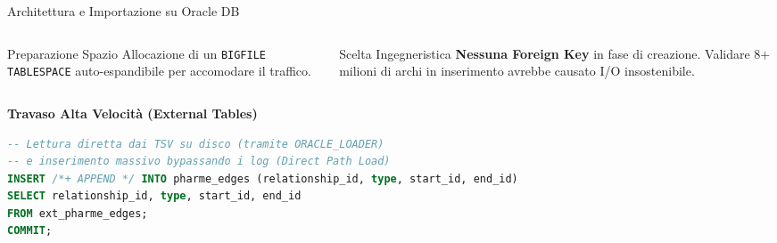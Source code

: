 \documentclass[aspectratio=169]{beamer}
\begin{document}
\begin{frame}[fragile]{Architettura e Importazione su Oracle DB}
    \begin{columns}[T]
        \begin{column}{0.48\textwidth}
            \begin{block}{\faDatabase \hspace{0.2cm} Preparazione Spazio}
                \small
                Allocazione di un \texttt{BIGFILE TABLESPACE} auto-espandibile per accomodare il traffico.
            \end{block}
        \end{column}
        
        \begin{column}{0.48\textwidth}
            \begin{alertblock}{\faExclamationTriangle \hspace{0.2cm} Scelta Ingegneristica}
                \small
                \textbf{Nessuna Foreign Key} in fase di creazione. Validare 8+ milioni di archi in inserimento avrebbe causato I/O insostenibile.
            \end{alertblock}
        \end{column}
    \end{columns}
    
    \vspace{0.4cm}
    \textbf{\faTractor \hspace{0.2cm} Travaso Alta Velocità (External Tables)}
    \begin{lstlisting}[language=SQL, basicstyle=\ttfamily\tiny]
-- Lettura diretta dai TSV su disco (tramite ORACLE_LOADER)
-- e inserimento massivo bypassando i log (Direct Path Load)
INSERT /*+ APPEND */ INTO pharme_edges (relationship_id, type, start_id, end_id) 
SELECT relationship_id, type, start_id, end_id 
FROM ext_pharme_edges;
COMMIT;
    \end{lstlisting}
\end{frame}
\end{document}
